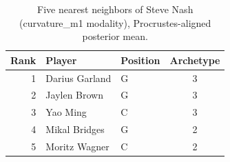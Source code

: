 \begin{table}[htbp]
  \centering\small
  \begin{tabular}{rllc}
    \toprule
    Rank & Player & Position & Archetype \\
    \midrule
    1 & Darius Garland & G & 3 \\
    2 & Jaylen Brown & G & 3 \\
    3 & Yao Ming & C & 3 \\
    4 & Mikal Bridges & G & 2 \\
    5 & Moritz Wagner & C & 2 \\
    \bottomrule
  \end{tabular}
  \caption{Five nearest neighbors of Steve Nash (curvature_m1 modality), Procrustes-aligned posterior mean.}
  \label{tab:Steve_Nash_neighbors_curvature_m1}
\end{table}

